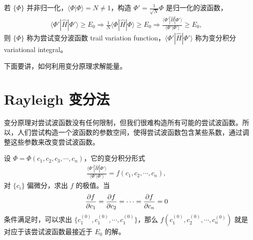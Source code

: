 若 $\{\Phi\}$ 并非归一化，$\langle\Phi|\Phi\rangle = N \neq 1$，构造 $\Phi' = \frac1{\sqrt N} \Phi$ 是归一化的波函数，
\begin{align}
    \langle \Phi' | \hat H | \Phi'  \rangle \geqslant E_0  \Rightarrow \frac1N \langle \Phi | \hat H | \Phi \rangle \geqslant E_0 \Rightarrow \frac{\langle \Phi' | \hat H | \Phi'  \rangle} {\langle \Phi' |  \Phi'  \rangle} \geqslant E_0,
\end{align}
则 $\{\Phi\}$ 称为尝试变分波函数 trail variation function，$\langle \Phi' | \hat H | \Phi'  \rangle$ 称为变分积分 variational integral。

下面要讲，如何利用变分原理求解能量。
\section{Rayleigh 变分法}
变分原理对尝试波函数没有任何限制，但我们很难构造所有可能的尝试波函数。所以，人们尝试构造一个波函数的参数空间，使得尝试波函数包含某些系数，通过调整这些参数来改变尝试波函数。

设 $\Phi=\Phi(c_1, c_2, c_3, \cdots, c_n)$，它的变分积分形式
\begin{align}
    \frac{\langle \Phi' | \hat H | \Phi'  \rangle} {\langle \Phi' |  \Phi'  \rangle} = f(c_1, c_2, \cdots, c_n),
\end{align}
对 $\{c_i\}$ 偏微分，求出 $f$ 的极值。当
\begin{align}
    \pdv{f}{c_1} = \pdv{f}{c_2} = \cdots = \pdv{f}{c_n} = 0
\end{align}
条件满足时，可以求出 $\{c_1^{(0)}, c_1^{(0)}, \cdots, c_1^{(0)}\}$，那么 $f(c_1^{(0)}, c_2^{(0)}, \cdots, c_n^{(0)})$ 就是对应于该尝试波函数最接近于 $E_0$ 的解。

